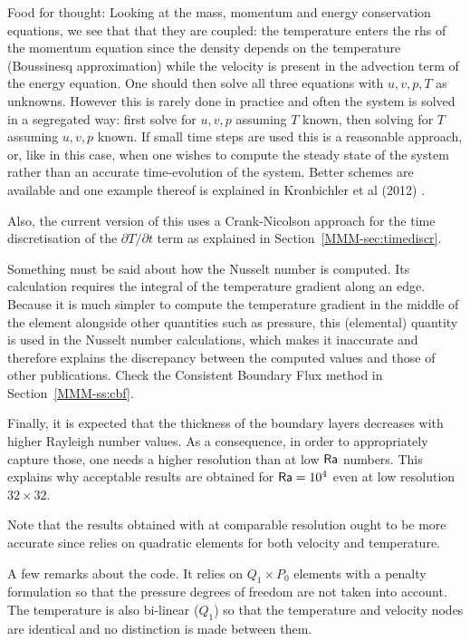 Food for thought: Looking at the mass, momentum and energy conservation equations, 
we see that that they are coupled: the temperature enters the rhs of the momentum 
equation since the density depends on the temperature (Boussinesq approximation)
while the velocity is present in the advection term of the energy equation.
One should then solve all three equations with $u,v,p,T$ as unknowns. However
this is rarely done in practice and often the system is solved in a segregated way:
first solve for $u,v,p$ assuming $T$ known, then solving for $T$ assuming $u,v,p$ known.
If small time steps are used this is a reasonable approach, or, like in this case, when 
one wishes to compute the steady state of the system rather than an accurate time-evolution
of the system. Better schemes are available and one example thereof is explained in Kronbichler et al (2012) 
\cite{krhb12}.

Also, the current version of this \stone uses a Crank-Nicolson approach for the 
time discretisation of the $\partial T/\partial t$ term as explained in Section~\ref{MMM-sec:timediscr}.

Something must be said about how the Nusselt number is computed. 
Its calculation requires the integral of the temperature gradient along an edge. 
Because it is much simpler to compute the temperature gradient in the middle of the 
element alongside other quantities such as pressure, this (elemental) quantity is 
used in the Nusselt number calculations, which makes it inaccurate and therefore 
explains the discrepancy between the computed values and those of other publications.
Check the Consistent Boundary Flux method in Section~\ref{MMM-ss:cbf}.

Finally, it is expected that the thickness of the 
boundary layers decreases with higher Rayleigh number values.
As a consequence, in order to appropriately capture those, one needs 
a higher resolution than at low ${\mathsf{Ra}}$ numbers. This explains why 
acceptable results are obtained for ${\mathsf{Ra}}=10^4$  even at low resolution $32\times 32$.

Note that the results obtained with \aspect at comparable resolution ought to be 
more accurate since \aspect relies on quadratic elements for both velocity and 
temperature. 

A few remarks about the code. It relies on $Q_1\times P_0$ elements with a penalty
formulation so that the pressure degrees of freedom are not taken into account. 
The temperature is also bi-linear ($Q_1$) so that the temperature and velocity nodes 
are identical and no distinction is made between them.

